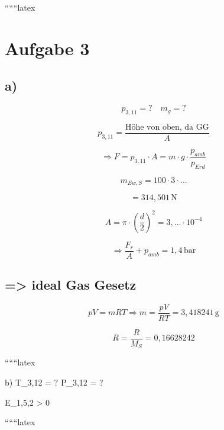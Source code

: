 
``````latex


\section*{Aufgabe 3}

\subsection*{a)}
\[ p_{3,11} = ? \quad m_g = ? \]

\[ p_{3,11} = \frac{\text{Höhe von oben, da GG}}{A} \]

\[
\Rightarrow F = p_{3,11} \cdot A = m \cdot g \cdot \frac{p_{amb}}{p_{Erd}} 
\]

\[ m_{Ew, S} = 100 \cdot 3 \cdot \ldots \]

\[ = 314,501 \, \text{N} \]

\[ A = \pi \cdot \left(\frac{d}{2}\right)^2 = 3, \ldots \cdot 10^{-4} \]

\[
\Rightarrow \frac{F_r}{A} + p_{amb} = 1,4 \, \text{bar}
\]

\subsection*{=> ideal Gas Gesetz}

\[
pV = mRT \Rightarrow m = \frac{pV}{RT} = 3,418241 \, \text{g}
\]

\[
R = \frac{R}{M_S} = 0,16628242
\]

``````latex


b) \quad T_{3,12} = ? \quad P_{3,12} = ? 

\quad \ast E_{1,5,2} > 0

``````latex


